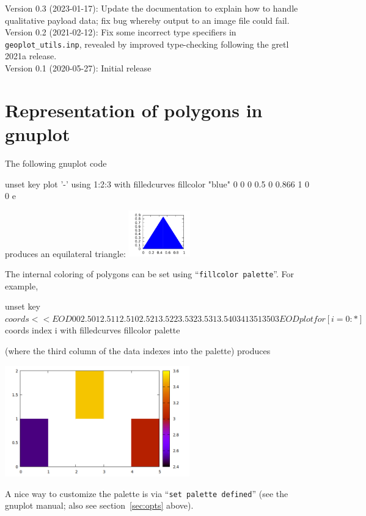 \documentclass{article}
\newcommand{\startappendices}{%
\newcounter{appcount}
\setcounter{appcount}{0}
\renewcommand{\thesection}{Appendix \Alph{appcount}}}
\newcommand{\myappendix}[1]{%
\addtocounter{appcount}{1}
\section{#1}}
\begin{document}
Version 0.3 (2023-01-17): Update the documentation to explain how to
handle qualitative payload data; fix bug whereby output to an image
file could fail. \\[6pt]
Version 0.2 (2021-02-12): Fix some incorrect type specifiers in
\verb|geoplot_utils.inp|, revealed by improved type-checking following
the gretl 2021a release. \\[6pt]
Version 0.1 (2020-05-27): Initial release

\clearpage
\startappendices

\myappendix{Representation of polygons in gnuplot}
\label{sec:gnuplot}

The
following \textsf{gnuplot} code
\begin{code}
  unset key
  plot '-' using 1:2:3 with filledcurves fillcolor "blue"
  0 0 0
  0.5 0 0.866
  1 0 0
  e
\end{code}
produces an equilateral triangle: \includegraphics[height=2cm]{triangle.pdf}

\medskip

The internal coloring of polygons can be set using ``\texttt{fillcolor
  palette}''. For example,
\begin{code}
unset key
$coords << EOD
0 0 2.5
0 1 2.5
1 1 2.5
1 0 2.5

2 1 3.5
2 2 3.5
3 2 3.5
3 1 3.5

4 0 3
4 1 3
5 1 3
5 0 3
EOD
plot for [i=0:*] $coords index i with filledcurves fillcolor palette
\end{code}
(where the third column of the data indexes into the palette) produces
\begin{center}
  \includegraphics[width=0.6\textwidth]{squares}
\end{center}

A nice way to customize the palette is via ``\texttt{set
  palette defined}'' (see the \textsf{gnuplot} manual; also see
section~\ref{sec:opts} above).
\end{document}
